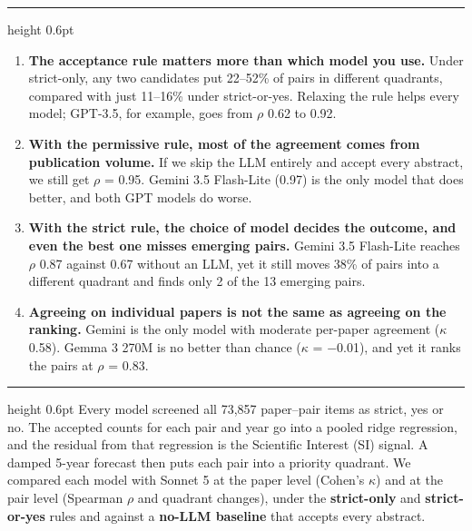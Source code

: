 \documentclass[10pt]{article}
\newcommand{\hd}[1]{\par\vspace{5pt}{\fontfamily{phv}\selectfont\bfseries\large #1}\par\vspace{1pt}\hrule height 0.6pt\vspace{4pt}}
\begin{document}
\vspace{2pt}
\begin{minipage}[t]{0.47\linewidth}
\hd{1.\enspace Key Findings}
\begin{enumerate}[label=\arabic*.,leftmargin=1.6em,itemsep=3pt,topsep=0pt]
\item \textbf{The acceptance rule matters more than which model you use.} Under strict-only, any two candidates put 22--52\% of pairs in different quadrants, compared with just 11--16\% under strict-or-yes. Relaxing the rule helps every model; GPT-3.5, for example, goes from $\rho$ 0.62 to 0.92.
\item \textbf{With the permissive rule, most of the agreement comes from publication volume.} If we skip the LLM entirely and accept every abstract, we still get $\rho$ = 0.95. Gemini 3.5 Flash-Lite (0.97) is the only model that does better, and both GPT models do worse.
\item \textbf{With the strict rule, the choice of model decides the outcome, and even the best one misses emerging pairs.} Gemini 3.5 Flash-Lite reaches $\rho$ 0.87 against 0.67 without an LLM, yet it still moves 38\% of pairs into a different quadrant and finds only 2 of the 13 emerging pairs.
\item \textbf{Agreeing on individual papers is not the same as agreeing on the ranking.} Gemini is the only model with moderate per-paper agreement ($\kappa$ 0.58). Gemma 3 270M is no better than chance ($\kappa$ = $-$0.01), and yet it ranks the pairs at $\rho$ = 0.83.
\end{enumerate}
\vspace{4pt}
\hd{2.\enspace Method}
{\small Every model screened all 73,857 paper--pair items as strict, yes or no. The accepted counts for each pair and year go into a pooled ridge regression, and the residual from that regression is the Scientific Interest (SI) signal. A damped 5-year forecast then puts each pair into a priority quadrant. We compared each model with Sonnet 5 at the paper level (Cohen's $\kappa$) and at the pair level (Spearman $\rho$ and quadrant changes), under the \textbf{strict-only} and \textbf{strict-or-yes} rules and against a \textbf{no-LLM baseline} that accepts every abstract.}
\end{minipage}\hfill
\end{document}
